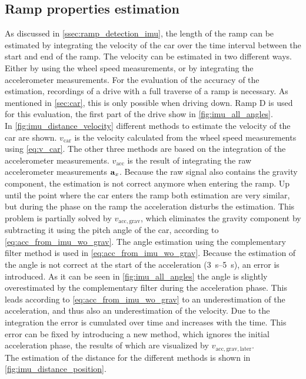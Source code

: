 \subsection{Ramp properties estimation}
As discussed in \cref{ssec:ramp_detection_imu}, the length of the ramp can be estimated by integrating the velocity of the car over the time interval between the start and end of the ramp.
The velocity can be estimated in two different ways.
Either by using the wheel speed measurements, or by integrating the accelerometer measurements.
For the evaluation of the accuracy of the estimation, recordings of a drive with a full traverse of a ramp is necessary.
As mentioned in \cref{sec:car}, this is only possible when driving down.
Ramp D is used for this evaluation, the first part of the drive show in \cref{fig:imu_all_angles}.\\
In \cref{fig:imu_distance_velocity} different methods to estimate the velocity of the car are shown.
$v_\mathrm{car}$ is the velocity calculated from the wheel speed measurements using \cref{eq:v_car}.
The other three methods are based on the integration of the accelerometer measurements.
$v_\mathrm{acc}$ is the result of integrating the raw accelerometer measurements $\vb{a}_x$.
Because the raw signal also contains the gravity component, the estimation is not correct anymore when entering the ramp.
Up until the point where the car enters the ramp both estimation are very similar, but during the phase on the ramp the acceleration disturbs the estimation.
This problem is partially solved by $v_\mathrm{acc, grav}$, which eliminates the gravity component by subtracting it using the pitch angle of the car, according to \cref{eq:acc_from_imu_wo_grav}.
The angle estimation using the complementary filter method is used in \cref{eq:acc_from_imu_wo_grav}.
Because the estimation of the angle is not correct at the start of the acceleration (\SIrange{3}{5}{\second}), an error is introduced.
As it can be seen in \cref{fig:imu_all_angles} the angle is slightly overestimated by the complementary filter during the acceleration phase.
This leads according to \cref{eq:acc_from_imu_wo_grav} to an underestimation of the acceleration, and thus also an underestimation of the velocity.
Due to the integration the error is cumulated over time and increases with the time.
This error can be fixed by introducing a new method, which ignores the initial acceleration phase, the results of which are visualized by $v_\mathrm{acc, grav, later}$.\\
The estimation of the distance for the different methods is shown in \cref{fig:imu_distance_position}.
